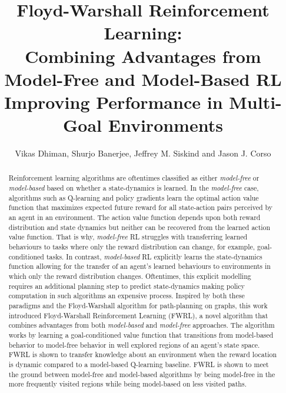 \documentclass[letterpaper]{article} %
\title{Floyd-Warshall Reinforcement Learning: \\Combining Advantages from
Model-Free and Model-Based RL \\ Improving Performance in Multi-Goal
Environments}
\author{Vikas Dhiman, Shurjo Banerjee, Jeffrey M. Siskind and Jason J.
Corso}
\begin{document}
\maketitle
\begin{abstract}
Reinforcement learning algorithms are oftentimes classified as either
\emph{model-free} or \emph{model-based} based on whether a state-dynamics
is learned. In the \emph{model-free} case, algorithms such as
Q-learning and policy gradients learn the optimal action value function that
maximizes expected future reward for all state-action pairs perceived by an
agent in an environment.
The action value function depends upon both reward distribution and state
dynamics but neither can be recovered from the learned action value function.
That is why, \emph{model-free} RL struggles with transferring learned behaviours
to tasks where only the reward distribution can change, for example,
goal-conditioned tasks.
In contrast, \emph{model-based} RL explicitly learns the state-dynamics
function allowing for the transfer of an agent's learned behaviours to
environments in which only the reward distribution changes. Oftentimes,
this explicit modelling requires  an additional planning step to predict
state-dynamics making policy computation in such algorithms
an expensive process.  Inspired by both these paradigms and the
Floyd-Warshall algorithm for path-planning on graphs,  this work
introduced Floyd-Warshall Reinforcement Learning (FWRL), a novel
algorithm that combines advantages from both \emph{model-based} and
\emph{model-free} approaches.  The algorithm works by learning a
goal-conditioned value function that transitions from model-based
behavior to model-free behavior in well explored regions of an agent's
state space.  FWRL is shown to transfer knowledge about an environment
when the reward location is dynamic compared to a model-based Q-learning
baseline.  FWRL is shown to meet the ground between model-free and
model-based algorithms by being model-free in the more frequently
visited regions while being model-based on less visited paths.


\end{abstract}
\end{document}
